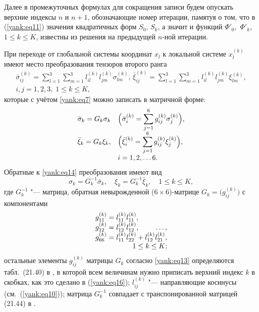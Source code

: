 Далее в промежуточных формулах для сокращения записи будем
опускать верхние индексы $n$ и $n+1$, обозначающие номер итерации,
памятуя о том, что в (\ref{yank:eq11}) значения квадратичных форм
$S_0 $, $S_k $, а значит и функций $\Phi'_0$,~$\Phi'_k $, $1\le
k\le K$, известны из решения на предыдущей $n$-ной итерации.

При переходе от глобальной системы координат $x_l $ к локальной
системе $x_l^{(k)}$ имеют место преобразования тензоров второго
ранга \cite{yank:bib7}
\begin{gather}
\label{yank:eq13} \bar {\sigma }_{ij}^{(k)} =\sum\limits_{l=1}^3
\sum\limits_{m=1}^3 l_{il}^{(k)} l_{jm}^{(k)} \sigma
_{lm}^{(k)},\, \bar {\xi}_{ij}^{(k)} =\sum\limits_{l=1}^3
\sum\limits_{m=1}^3 l_{il}^{(k)} l_{jm}^{(k)} \xi
_{lm}^{(k)},\\ 
i, j=1, 2, 3,\; 1\le k\le K,
\end{gather}
которые с учётом \eqref{yank:eq7} можно записать в матричной
форме:
\begin{equation}
\label{yank:eq14}
\begin{array}{rl}
\displaystyle \bar {\sigma }_k =G_k \sigma _k  & 
\displaystyle  \Bigl(\bar {\sigma }_i^{(k)} =\sum\limits_{j=1}^6 g_{ij}^{(k)} \sigma _j^{(k)}\Bigr),\\
\displaystyle  \bar {\xi}_k = G_k \xi _k, & 
\displaystyle  \Bigl(\bar {\xi}_i^{(k)} =\sum\limits_{j=1}^6 g_{ij}^{(k)} \xi _j^{(k)} \Bigr),\\ 
& i=1, 2, \dots 6.
\end{array}
\end{equation}
Обратные к \eqref{yank:eq14} преобразования имеют вид
\begin{equation}
\label{yank:eq15}
\sigma _k =G_k^{-1} \bar {\sigma }_k,\quad \xi _k =G_k^{-1} \bar {\xi }_k ,\quad 1\le
k\le K,
\end{equation}
где $G_k^{-1} $ "--- матрица, обратная невырожденной ($6{\times}6$)-матрице $G_k =\bigl( g_{ij}^{(k)} \bigr)$ с компонентами
\begin{equation}
\label{yank:eq16}
\begin{array}{l}
g_{11}^{(k)} =l_{11}^{(k)} l_{11}^{(k)},\\
g_{12}^{(k)} =l_{12}^{(k)} l_{12}^{(k)}, \hfill \ldots, \\ 
 g_{66}^{(k)} =l_{11}^{(k)} l_{22}^{(k)} +l_{12}^{(k)} l_{21}^{(k)},\\
\hfill 1\le k\le K;
 \end{array}
\end{equation}
остальные элементы $g_{ij}^{(k)} $ матрицы $G_k$ согласно \eqref{yank:eq13} определяются
табл.~(21.40) в \cite{yank:bib7}, в которой всем величинам нужно приписать верхний индекс
$k$ в скобках, как это сделано в (\ref{yank:eq16}); $l_{ij}^{(k)} $ "--- направляющие косинусы
(см.~(\ref{yank:eq10})); матрица $G_k^{-1}$ совпадает с транспонированной матрицей
(21.44) в \cite{yank:bib7}.

